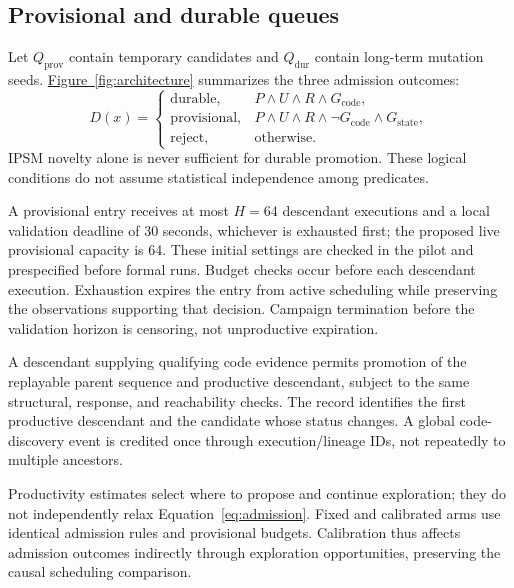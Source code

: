 \documentclass[final,5p,times,number]{elsarticle}
\newcommand{\gcode}{G_{\mathrm{code}}}
\newcommand{\gstate}{G_{\mathrm{state}}}
\newcommand{\namedref}[2]{\hyperref[#2]{#1~\ref*{#2}}}
\begin{document}
\subsection{Provisional and durable queues}
Let $Q_{\mathrm{prov}}$ contain temporary candidates and $Q_{\mathrm{dur}}$ contain long-term mutation seeds. \namedref{Figure}{fig:architecture} summarizes the three admission outcomes:
\begin{equation}
D(x)=
\begin{cases}
\mathrm{durable}, & P\land U\land R\land\gcode,\\
\mathrm{provisional}, & P\land U\land R\land\neg\gcode\land\gstate,\\
\mathrm{reject}, & \text{otherwise}.
\end{cases}\label{eq:admission}
\end{equation}
IPSM novelty alone is never sufficient for durable promotion. These logical conditions do not assume statistical independence among predicates.

A provisional entry receives at most $H=64$ descendant executions and a local validation deadline of 30 seconds, whichever is exhausted first; the proposed live provisional capacity is 64. These initial settings are checked in the pilot and prespecified before formal runs. Budget checks occur before each descendant execution. Exhaustion expires the entry from active scheduling while preserving the observations supporting that decision. Campaign termination before the validation horizon is censoring, not unproductive expiration.

A descendant supplying qualifying code evidence permits promotion of the replayable parent sequence and productive descendant, subject to the same structural, response, and reachability checks. The record identifies the first productive descendant and the candidate whose status changes. A global code-discovery event is credited once through execution/lineage IDs, not repeatedly to multiple ancestors.

Productivity estimates select where to propose and continue exploration; they do not independently relax Equation~\ref{eq:admission}. Fixed and calibrated arms use identical admission rules and provisional budgets. Calibration thus affects admission outcomes indirectly through exploration opportunities, preserving the causal scheduling comparison.
\end{document}
